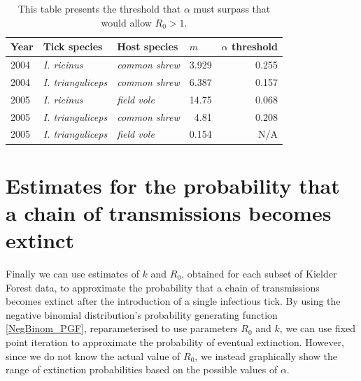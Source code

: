 \documentclass[hidelinks]{article}
\begin{document}
\begin{table}[h]
	\begin{mdframed}[backgroundcolor=grey250,rightline=false,leftline=false,topline=false]
	\centering
	\begin{tabular}{|l|l|l|r|r|}
		\hline
		\textbf{Year} & \textbf{Tick species} & \textbf{Host species} & \multicolumn{1}{l|}{\textbf{$m$}} & \multicolumn{1}{l|}{\textbf{$ \alpha $ threshold}} \\ \hline
		2004          & \textit{I. ricinus}            & \textit{common shrew}          & 3.929                             & 0.255                                              \\ \hline
		2004          & \textit{I. trianguliceps}      & \textit{common shrew}         & 6.387                             & 0.157                                              \\ \hline
		2005          & \textit{I. ricinus}            & \textit{field vole}           & 14.75                             & 0.068                                              \\ \hline
		2005          & \textit{I. trianguliceps}      & \textit{common shrew}          & 4.81                              & 0.208                                              \\ \hline
		2005          & \textit{I. trianguliceps}      & \textit{field vole}            & 0.154                             & N/A                                                \\ \hline
	\end{tabular}
	\caption{This table presents the threshold that $ \alpha $ must surpass that would allow $ R_0 > 1 $.} 
	\label{tab:alpha_threshold}
	\end{mdframed}
\end{table}

\newpage

\section{Estimates for the probability that a chain of transmissions becomes extinct} 

Finally we can use estimates of $ k $ and $ R_0 $, obtained for each subset of Kielder Forest data, to approximate the probability that a chain of transmissions becomes extinct after the introduction of a single infectious tick. By using the negative binomial distribution's probability generating function \eqref{NegBinom_PGF}, reparameterised to use parameters $ R_0 $ and $ k $, we can use fixed point iteration to approximate the probability of eventual extinction. However, since we do not know the actual value of $ R_0 $, we instead graphically show the range of extinction probabilities based on the possible values of $ \alpha $.
\end{document}
